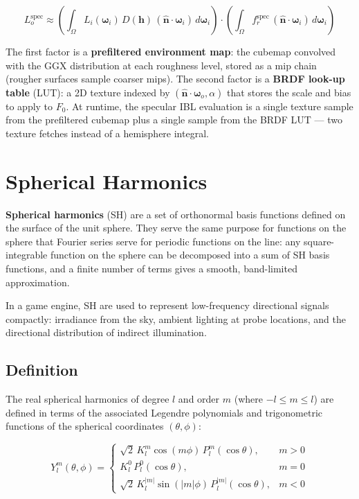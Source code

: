 \documentclass[
  11pt,
  letterpaper,
  DIV=11,
  numbers=noendperiod,
  twoside,
  open=right]{scrreprt}
\begin{document}
\[
L_o^{\text{spec}} \approx \left(\int_{\Omega} L_i(\boldsymbol{\omega}_i) \, D(\mathbf{h}) \, (\hat{\mathbf{n}} \cdot \boldsymbol{\omega}_i) \, d\boldsymbol{\omega}_i\right) \cdot \left(\int_{\Omega} f_r^{\text{spec}} \, (\hat{\mathbf{n}} \cdot \boldsymbol{\omega}_i) \, d\boldsymbol{\omega}_i\right)
\]

The first factor is a \textbf{prefiltered environment map}: the cubemap
convolved with the GGX distribution at each roughness level, stored as a
mip chain (rougher surfaces sample coarser mips). The second factor is a
\textbf{BRDF look-up table} (LUT): a 2D texture indexed by
\((\hat{\mathbf{n}} \cdot \boldsymbol{\omega}_o, \alpha)\) that stores
the scale and bias to apply to \(F_0\). At runtime, the specular IBL
evaluation is a single texture sample from the prefiltered cubemap plus
a single sample from the BRDF LUT --- two texture fetches instead of a
hemisphere integral.

\section{Spherical Harmonics}\label{spherical-harmonics}

\textbf{Spherical harmonics} (SH) are a set of orthonormal basis
functions defined on the surface of the unit sphere. They serve the same
purpose for functions on the sphere that Fourier series serve for
periodic functions on the line: any square-integrable function on the
sphere can be decomposed into a sum of SH basis functions, and a finite
number of terms gives a smooth, band-limited approximation.

In a game engine, SH are used to represent low-frequency directional
signals compactly: irradiance from the sky, ambient lighting at probe
locations, and the directional distribution of indirect illumination.

\subsection{Definition}\label{definition}

The real spherical harmonics of degree \(l\) and order \(m\) (where
\(-l \leq m \leq l\)) are defined in terms of the associated Legendre
polynomials and trigonometric functions of the spherical coordinates
\((\theta, \phi)\):

\[
Y_l^m(\theta, \phi) = \begin{cases}
  \sqrt{2} \, K_l^m \cos(m\phi) \, P_l^m(\cos\theta), & m > 0 \\
  K_l^0 \, P_l^0(\cos\theta), & m = 0 \\
  \sqrt{2} \, K_l^{|m|} \sin(|m|\phi) \, P_l^{|m|}(\cos\theta), & m < 0
\end{cases}
\]
\end{document}

